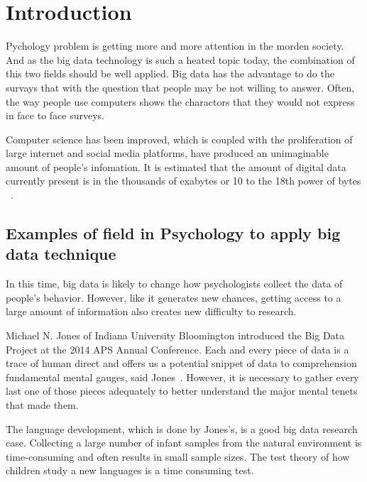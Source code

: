 

\maketitle

\section{Introduction}

Pychology problem is getting more and more attention in the morden
society. And as the big data technology is such a heated topic 
today, the combination of this two fields should be well applied.
Big data has the advantage to do the survays that with the question 
that people may be not willing to answer. 
Often, the way people use computers shows the charactors that they
 would not express in face to face surveys.

Computer science has been improved, which is coupled with the 
proliferation of large internet and social media platforms,
 have produced an unimaginable amount of people's infomation.
It is estimated that the amount of digital data currently present 
is in the thousands of exabytes or 10 to the 18th power of bytes
~\cite{hid515-00}.

\subsection{Examples of field in Psychology to apply big data technique}

In this time, big data is likely to change how psychologists 
collect the data of people's behavior. 
However, like it generates new 
chances, getting access to a large amount of information also creates
 new difficulty to research. 

Michael N. Jones of 
Indiana University Bloomington introduced the Big Data Project at 
the 2014 APS Annual Conference.
Each and every piece of data is a trace of human direct and 
offers us a potential snippet of data to comprehension 
fundamental mental gauges, said Jones~\cite{hid515-00}. 
However, it is necessary to gather every last one of 
those pieces adequately to better understand the major mental 
tenets that made them.

The language development, which is done by Jones's, is a good big data
 research case. 
Collecting a large number of infant samples from the natural 
environment is time-consuming and often results in small sample 
sizes. The test theory of how children study a new languages is a 
time consuming test.

